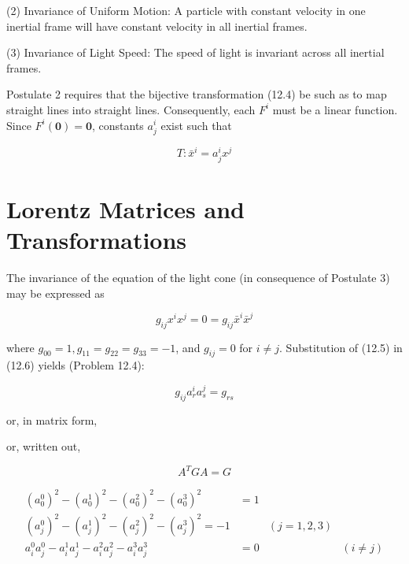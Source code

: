 \documentclass[10pt]{article}
\begin{document}
(2) Invariance of Uniform Motion: A particle with constant velocity in one inertial frame will have constant velocity in all inertial frames.

(3) Invariance of Light Speed: The speed of light is invariant across all inertial frames.

Postulate 2 requires that the bijective transformation (12.4) be such as to map straight lines into straight lines. Consequently, each $F^{i}$ must be a linear function. Since $F^{i}(\mathbf{0})=\mathbf{0}$, constants $a_{j}^{i}$ exist such that


\begin{equation*}
T: \bar{x}^{i}=a_{j}^{i} x^{j} \tag{12.5}
\end{equation*}


\section*{Lorentz Matrices and Transformations}
The invariance of the equation of the light cone (in consequence of Postulate 3) may be expressed as


\begin{equation*}
g_{i j} x^{i} x^{j}=0=g_{i j} \bar{x}^{i} \bar{x}^{j} \tag{12.6}
\end{equation*}


where $g_{00}=1, g_{11}=g_{22}=g_{33}=-1$, and $g_{i j}=0$ for $i \neq j$. Substitution of (12.5) in (12.6) yields (Problem 12.4):


\begin{equation*}
g_{i j} a_{r}^{i} a_{s}^{j}=g_{r s} \tag{12.7a}
\end{equation*}


or, in matrix form,

or, written out,


\begin{equation*}
A^{T} G A=G \tag{12.7b}
\end{equation*}


\[
\begin{array}{rlrl}
\left(a_{0}^{0}\right)^{2}-\left(a_{0}^{1}\right)^{2}-\left(a_{0}^{2}\right)^{2}-\left(a_{0}^{3}\right)^{2} & =1 & \\
\left(a_{j}^{0}\right)^{2}-\left(a_{j}^{1}\right)^{2}-\left(a_{j}^{2}\right)^{2}-\left(a_{j}^{3}\right)^{2}=-1 & & (j=1,2,3)  \tag{12.7c}\\
a_{i}^{0} a_{j}^{0}-a_{i}^{1} a_{j}^{1}-a_{i}^{2} a_{j}^{2}-a_{i}^{3} a_{j}^{3} & =0 & & (i \neq j)
\end{array}
\]
\end{document}
